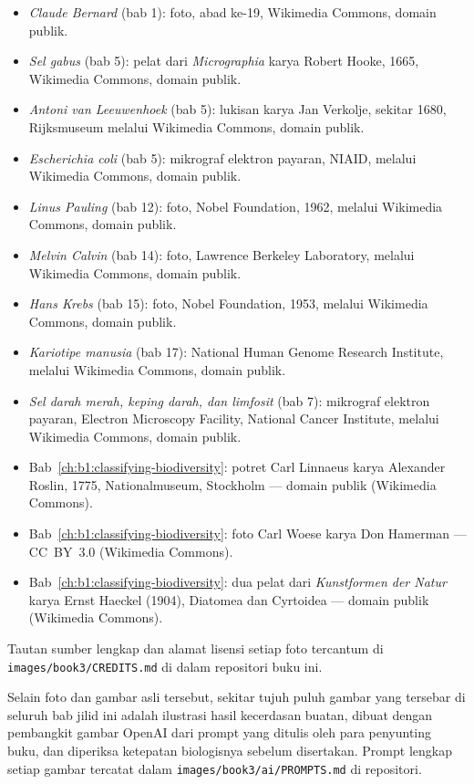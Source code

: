 \begin{itemize}
  \item \emph{Claude Bernard} (bab 1): foto, abad ke-19, Wikimedia
        Commons, domain publik.
  \item \emph{Sel gabus} (bab 5): pelat dari \emph{Micrographia} karya
        Robert Hooke, 1665, Wikimedia Commons, domain publik.
  \item \emph{Antoni van Leeuwenhoek} (bab 5): lukisan karya Jan
        Verkolje, sekitar 1680, Rijksmuseum melalui Wikimedia Commons,
        domain publik.
  \item \emph{Escherichia coli} (bab 5): mikrograf elektron payaran,
        NIAID, melalui Wikimedia Commons, domain publik.
  \item \emph{Linus Pauling} (bab 12): foto, Nobel Foundation, 1962,
        melalui Wikimedia Commons, domain publik.
  \item \emph{Melvin Calvin} (bab 14): foto, Lawrence Berkeley
        Laboratory, melalui Wikimedia Commons, domain publik.
  \item \emph{Hans Krebs} (bab 15): foto, Nobel Foundation, 1953,
        melalui Wikimedia Commons, domain publik.
  \item \emph{Kariotipe manusia} (bab 17): National Human Genome
        Research Institute, melalui Wikimedia Commons, domain publik.
  \item \emph{Sel darah merah, keping darah, dan limfosit} (bab 7):
        mikrograf elektron payaran, Electron Microscopy Facility,
        National Cancer Institute, melalui Wikimedia Commons, domain
        publik.
  \item Bab~\ref{ch:b1:classifying-biodiversity}: potret Carl Linnaeus karya Alexander Roslin, 1775, Nationalmuseum, Stockholm --- domain publik (Wikimedia Commons).
  \item Bab~\ref{ch:b1:classifying-biodiversity}: foto Carl Woese karya Don Hamerman --- CC~BY~3.0 (Wikimedia Commons).
  \item Bab~\ref{ch:b1:classifying-biodiversity}: dua pelat dari \emph{Kunstformen der Natur} karya Ernst Haeckel (1904), Diatomea dan Cyrtoidea --- domain publik (Wikimedia Commons).
\end{itemize}

Tautan sumber lengkap dan alamat lisensi setiap foto tercantum di
\texttt{images/\allowbreak book3/\allowbreak CREDITS.md} di dalam repositori buku ini.

\bigskip
Selain foto dan gambar asli tersebut, sekitar tujuh puluh gambar yang
tersebar di seluruh bab jilid ini adalah ilustrasi hasil kecerdasan
buatan, dibuat dengan pembangkit gambar OpenAI dari prompt yang ditulis
oleh para penyunting buku, dan diperiksa ketepatan biologisnya sebelum
disertakan. Prompt lengkap setiap gambar tercatat dalam
\texttt{images/\allowbreak book3/\allowbreak ai/\allowbreak PROMPTS.md} di repositori.
\par\endgroup
\clearpage
